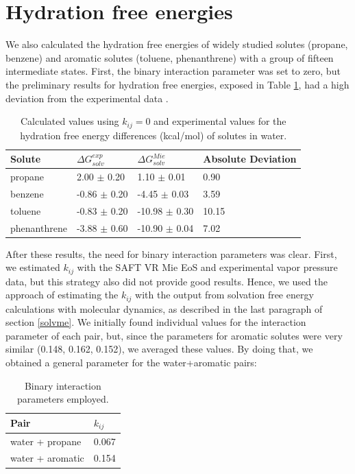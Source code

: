 \section{Hydration free energies}

We also calculated the hydration free energies of widely studied solutes (propane, benzene) and aromatic solutes (toluene, phenanthrene) with a group of fifteen intermediate states. First, the binary interaction parameter was set to zero, but the preliminary results for hydration free energies, exposed in Table \ref{tbl:solv3},  had a high deviation from the experimental data \cite{P29900000291, doi:10.1021/ct050097l}.

\FloatBarrier
\begin{table}[h]
    \centering
    \caption{Calculated values using $k_{ij}=0$ and experimental values for the hydration free energy differences (kcal/mol) of solutes in water.}
    \label{tbl:solv3}
    \begin{tabular}{llll}
        \hline
        \hline
        Solute  & $\Delta G_{solv}^{exp}$ & $\Delta G_{solv}^{Mie}$& Absolute Deviation\\
        \hline
        propane   & 2.00 $\pm$ 0.20&1.10 $\pm$ 0.01 & 0.90 \\
        benzene  & -0.86 $\pm$ 0.20 & -4.45 $\pm$ 0.03&  3.59 \\
        toluene  & -0.83 $\pm$ 0.20 &-10.98 $\pm$ 0.30&  10.15 \\
        phenanthrene & -3.88 $\pm$ 0.60 &-10.90 $\pm$ 0.04& 7.02  \\
        \hline
        \hline
    \end{tabular}
\end{table}
\FloatBarrier

After these results, the need for binary interaction parameters was clear. First, we estimated $k_{ij}$ with the SAFT VR Mie EoS and experimental vapor pressure data, but this strategy also did not provide good results. Hence, we used the approach of estimating the $k_{ij}$ with the output from solvation free energy calculations with molecular dynamics, as described in the last paragraph of section \ref{solvme}.  We initially found individual values for the interaction parameter of each pair, but, since the parameters for aromatic solutes were very similar (0.148, 0.162, 0.152), we averaged these values. By doing that,  we obtained a general parameter for the water+aromatic pairs:

\begin{table}[h]
  \centering
  \caption{Binary interaction parameters employed.}
  \label{tbl:kij}
  \begin{tabular}{ll}
    \hline
    \hline
      Pair & $k_{ij}$ \\
    \hline
    water  + propane      & 0.067  \\
    water  + aromatic      & 0.154 \\  
    \hline
    \hline
  \end{tabular}
\end{table}

